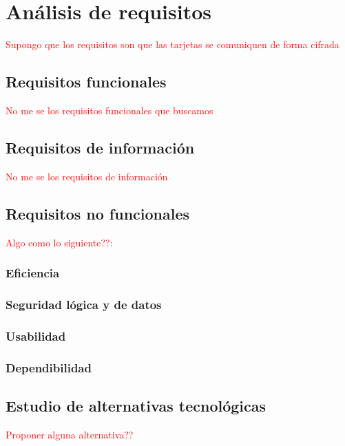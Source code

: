 \chapter{Análisis de requisitos}
\textcolor{red}{Supongo que los requisitos son que las tarjetas se comuniquen de forma cifrada}

\section{Requisitos funcionales}
\textcolor{red}{No me se los requisitos funcionales que buscamos}


\section{Requisitos de información}
\textcolor{red}{No me se los requisitos de información}

\section{Requisitos no funcionales}
\textcolor{red}{Algo como lo siguiente??:}
\subsection{Eficiencia}

\subsection{Seguridad lógica y de datos}

\subsection{Usabilidad}

\subsection{Dependibilidad}


\section{Estudio de alternativas tecnológicas}
\textcolor{red}{Proponer alguna alternativa??}

